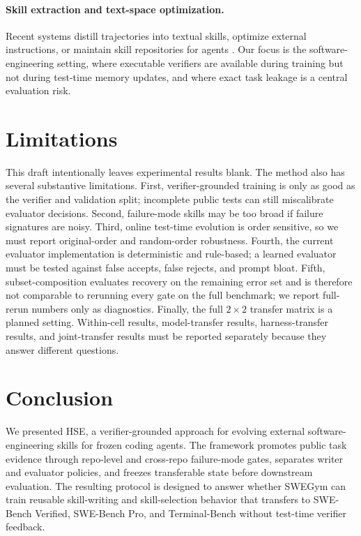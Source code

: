 \documentclass{article}
\newcommand{\method}{HSE}
\begin{document}
\paragraph{Skill extraction and text-space optimization.}
Recent systems distill trajectories into textual skills, optimize external
instructions, or maintain skill repositories for agents
\citep{trace2skill2024,skillopt2024,skillos2025,autoskill2023}. Our focus is
the software-engineering setting, where executable verifiers are available
during training but not during test-time memory updates, and where exact task
leakage is a central evaluation risk.

\section{Limitations}

This draft intentionally leaves experimental results blank. The method also has
several substantive limitations. First, verifier-grounded training is only as
good as the verifier and validation split; incomplete public tests can still
miscalibrate evaluator decisions. Second, failure-mode skills may be too broad
if failure signatures are noisy. Third, online test-time evolution is order
sensitive, so we must report original-order and random-order robustness. Fourth,
the current evaluator implementation is deterministic and rule-based; a learned
evaluator must be tested against false accepts, false rejects, and prompt bloat.
Fifth, subset-composition evaluates recovery on the remaining error set and is
therefore not comparable to rerunning every gate on the full benchmark; we
report full-rerun numbers only as diagnostics. Finally, the full $2{\times}2$
transfer matrix is a planned setting. Within-cell
results, model-transfer results, harness-transfer results, and joint-transfer
results must be reported separately because they answer different questions.

\section{Conclusion}

We presented \method{}, a verifier-grounded approach for evolving external
software-engineering skills for frozen coding agents. The framework promotes
public task evidence through repo-level and cross-repo failure-mode gates,
separates writer and evaluator policies, and freezes transferable state before
downstream evaluation. The resulting protocol is designed to answer whether
SWEGym can train reusable skill-writing and skill-selection behavior that
transfers to SWE-Bench Verified, SWE-Bench Pro, and Terminal-Bench without
test-time verifier feedback.
\end{document}
